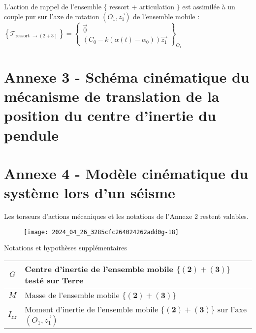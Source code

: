 L'action de rappel de l'ensemble $\{$ ressort + articulation $\}$ est assimilée à un couple pur sur l'axe de rotation $\left(O_{1}, \overrightarrow{z_{1}}\right)$ de l'ensemble mobile :
$\left\{\mathcal{T}_{\text {ressort } \rightarrow(2+3)}\right\}=\left\{\begin{array}{c}\overrightarrow{0} \\ \left(C_{0}-k\left(\alpha(t)-\alpha_{0}\right)\right) \overrightarrow{z_{1}}\end{array}\right\}_{O_{1}}$

\section*{Annexe 3 - Schéma cinématique du mécanisme de translation de la position du centre d'inertie du pendule}

\begin{center}
\end{center}


\section*{Annexe 4 - Modèle cinématique du système lors d'un séisme}
Les torseurs d'actions mécaniques et les notations de l'Annexe 2 restent valables.

\begin{figure}[!h]
\centering
\texttt{[image: 2024\_04\_26\_3285cfc264024262add0g-18]}
\end{figure}

Notations et hypothèses supplémentaires

\begin{center}
\begin{tabular}{|c|l|}
\hline
$G$ & Centre d'inertie de l'ensemble mobile $\{(\mathbf{2})+(\mathbf{3})\}$ testé sur Terre \\
\hline
$M$ & Masse de l'ensemble mobile $\{\mathbf{( 2 )}+\mathbf{( 3 )}\}$ \\
\hline
$I_{z z}$ & Moment d'inertie de l'ensemble mobile 
$\{(\mathbf{2})+(\mathbf{3})\}$ sur l'axe $\left(O_{1}, \overrightarrow{z_{1}}\right)$ \\
\hline
\end{tabular}
\end{center}

